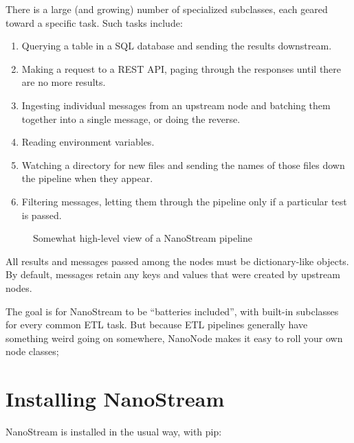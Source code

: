 \documentclass[letterpaper,10pt,english]{sphinxmanual}
\let\sphinxpxdimen\pdfpxdimen\else\newdimen\sphinxpxdimen
\begin{document}
There is a large (and growing) number of specialized  subclasses,
each geared toward a specific task. Such tasks include:
\begin{enumerate}
\def\theenumi{\arabic{enumi}}
\def\labelenumi{\theenumi .}
\makeatletter\def\p@enumii{\p@enumi \theenumi .}\makeatother
\item {} 
Querying a table in a SQL database and sending the results downstream.

\item {} 
Making a request to a REST API, paging through the responses until there are
no more results.

\item {} 
Ingesting individual messages from an upstream node and batching them
together into a single message, or doing the reverse.

\item {} 
Reading environment variables.

\item {} 
Watching a directory for new files and sending the names of those files
down the pipeline when they appear.

\item {} 
Filtering messages, letting them through the pipeline only if a particular
test is passed.

\end{enumerate}

\begin{figure}[htbp]
\centering
\capstart

\noindent\sphinxincludegraphics[width=600\sphinxpxdimen]{{10k_view}.png}
\caption{Somewhat high-level view of a NanoStream pipeline}\label{\detokenize{overview:id2}}\end{figure}

All results and messages passed among the nodes must be dictionary-like
objects. By default, messages retain any keys and values that were created by upstream nodes.

The goal is for NanoStream to be “batteries included”, with built-in
 subclasses for every common ETL task. But because ETL pipelines
generally have something weird going on somewhere, NanoNode makes it easy to
roll your own node classes;


\section{Installing NanoStream}
\label{\detokenize{overview:installing-nanostream}}
NanoStream is installed in the usual way, with pip:
\end{document}
